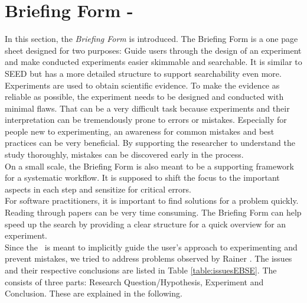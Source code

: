 
\section{Briefing Form - \briefingform}
\label{sec:briefing form}

In this section, the \textit{Briefing Form} is introduced. The Briefing Form is a one page sheet designed for two purposes: Guide users through the design of an experiment and make conducted experiments easier skimmable and searchable. It is similar to SEED but has a more detailed structure to support searchability even more.\\
Experiments are used to obtain scientific evidence. To make the evidence as reliable as possible, the experiment needs to be designed and conducted with minimal flaws. That can be a very difficult task because experiments and their interpretation can be tremendously prone to errors or mistakes. Especially for people new to experimenting, an awareness for common mistakes and best practices can be very beneficial. By supporting the researcher to understand the study thoroughly, mistakes can be discovered early in the process.\\
On a small scale, the Briefing Form is also meant to be a  supporting framework for a systematic workflow. It is supposed to shift the focus to the important aspects in each step and sensitize for critical errors.\\
For software practitioners, it is important to find solutions for a problem quickly. Reading through papers can be very time consuming. The Briefing Form can help speed up the search by providing a clear structure for a quick overview for an experiment.\\
Since the \briefingform~is meant to implicitly guide the user's approach to experimenting and prevent mistakes, we tried to address problems observed  by Rainer \etal \cite{Rainer2006}. The issues and their respective conclusions are listed in Table \ref{table:issuesEBSE}. The \briefingform consists of three parts: Research Question/Hypothesis, Experiment and Conclusion. These are explained in the following.\\

